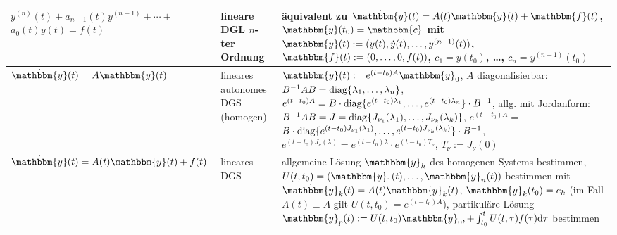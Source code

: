 \begin{landscape}
\begin{tabular}{p{50mm}p{50mm}p{148mm}}
        \midrule
        
        $y^{(n)}(t) + a_{n-1}(t) y^{(n-1)} + \dotsb +$ \newline
        $a_0(t) y(t) = f(t)$ &
        lineare DGL \newline
        $n$-ter Ordnung &
        äquivalent zu
        $\dot{\mathbbm{y}}(t) = A(t) \mathbbm{y}(t) + \mathbbm{f}(t)$,
        $\mathbbm{y}(t_0) = \mathbbm{c}$ mit
        $\mathbbm{y}(t) := (y(t), \dot{y}(t), \dotsc, y^{(n-1)}(t))$, \newline
        $\mathbbm{f}(t) := (0, \dotsc, 0, f(t))$,
        $c_1 = y(t_0)$, \dots, $c_n = y^{(n-1)}(t_0)$ \\
        
        \midrule
        
        $\dot{\mathbbm{y}}(t) = A \mathbbm{y}(t)$ &
        lineares autonomes DGS \newline
        (homogen) &
        $\mathbbm{y}(t) := e^{(t - t_0)A} \mathbbm{y}_0$, \newline
        \underline{$A$ diagonalisierbar}:
        $B^{-1} A B = \operatorname{diag}\{\lambda_1, \dotsc, \lambda_n\}$,
        $e^{(t - t_0)A} = B \cdot \operatorname{diag}\{e^{(t - t_0)\lambda_1}, \dotsc,
        e^{(t - t_0)\lambda_n}\} \cdot B^{-1}$, \newline
        \underline{allg. mit Jordanform}:
        $B^{-1} A B = J = \operatorname{diag}\{J_{\nu_1}(\lambda_1), \dotsc,
        J_{\nu_k}(\lambda_k)\}$,
        $e^{(t - t_0)A} =$ \newline
        $B \cdot \operatorname{diag}\{e^{(t - t_0)J_{\nu_1}(\lambda_1)},
        \dotsc, e^{(t - t_0)J_{\nu_k}(\lambda_k)}\} \cdot B^{-1}$,
        $e^{(t - t_0)J_\nu(\lambda)} =
        e^{(t - t_0)\lambda} \cdot e^{(t - t_0)T_\nu}$,
        $T_\nu := J_\nu(0)$ \\
        
        \midrule
        
        $\dot{\mathbbm{y}}(t) = A(t) \mathbbm{y}(t) + f(t)$ &
        lineares DGS &
        allgemeine Lösung $\mathbbm{y}_h$ des homogenen Systems bestimmen,
        $U(t, t_0) = (\mathbbm{y}_1(t), \dots, \mathbbm{y}_n(t))$
        bestimmen mit $\dot{\mathbbm{y}}_k(t) = A(t) \mathbbm{y}_k(t)$,
        $\mathbbm{y}_k(t_0) = e_k$
        (im Fall $A(t) \equiv A$ gilt $U(t, t_0) = e^{(t - t_0)A}$), \newline
        partikuläre Lösung $\mathbbm{y}_p(t) := U(t, t_0)\mathbbm{y}_0, +
        \int_{t_0}^t U(t, \tau)f(\tau) \d\tau$ bestimmen \\
        
        \bottomrule
    \end{tabular}
\end{landscape}

\pagebreak
